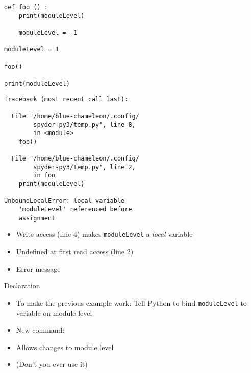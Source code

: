 \begin{frame}[fragile]
%
\begin{tcbraster}[raster columns=2,
                  raster equal height,
                  nobeforeafter,
                  raster column skip=0.5cm]
\begin{warnbox}[Example: Nonlocal Variables (2), leftupper=7mm]
\begin{verbatim}
def foo () :
    print(moduleLevel)
    
    moduleLevel = -1

moduleLevel = 1

foo()

print(moduleLevel)

\end{verbatim}
\end{warnbox}
%
\begin{cmdbox}
\begin{verbatim}
Traceback (most recent call last):

  File "/home/blue-chameleon/.config/
        spyder-py3/temp.py", line 8, 
        in <module>
    foo()

  File "/home/blue-chameleon/.config/
        spyder-py3/temp.py", line 2,
        in foo
    print(moduleLevel)

UnboundLocalError: local variable 
    'moduleLevel' referenced before
    assignment
\end{verbatim}
\end{cmdbox}
\end{tcbraster}
%
\begin{itemize}
\item Write access (line 4) makes \texttt{moduleLevel} a \emph{local} variable
\item Undefined at first read access (line 2)
\item[\Thus] Error message
\end{itemize}
%
\end{frame}


\begin{frame}[fragile]{ Declaration}
%
\begin{itemize}
\item To make the previous example work: Tell Python to bind \texttt{moduleLevel} to variable on module level
\item New command: 
\item Allows changes to module level
\item (Don't you ever use it)
\end{itemize}
%
\end{frame}

